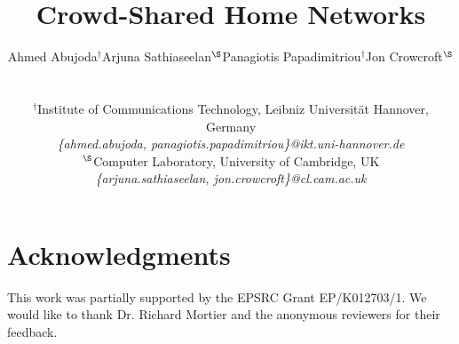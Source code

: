\documentclass[conference]{IEEEtran}
\begin{document}
\title{Crowd-Shared Home Networks}

\author{
\begin{tabular}{cccc}
\multicolumn{1}{c}{Ahmed Abujoda$^{\dagger}$} &
\multicolumn{1}{c}{Arjuna Sathiaseelan$^{\S}$} &
\multicolumn{1}{c}{Panagiotis Papadimitriou$^{\dagger}$} &
\multicolumn{1}{c}{Jon Crowcroft$^{\S}$} \\ 
\end{tabular}\\
\\
$^{\dagger}$Institute of Communications Technology, Leibniz Universit\"at Hannover, Germany\\
\textit{\footnotesize{\{ahmed.abujoda, panagiotis.papadimitriou\}@ikt.uni-hannover.de}}\\
$^{\S}$Computer Laboratory, University of Cambridge, UK\\
\textit{\footnotesize{\{arjuna.sathiaseelan, jon.crowcroft\}@cl.cam.ac.uk}} \\
}

\maketitle

\begin{abstract}

\end{abstract}






\section{Acknowledgments}
This work was partially supported by the EPSRC Grant EP/K012703/1. We would like to thank Dr. Richard Mortier and the anonymous reviewers for their feedback.
\end{document}
